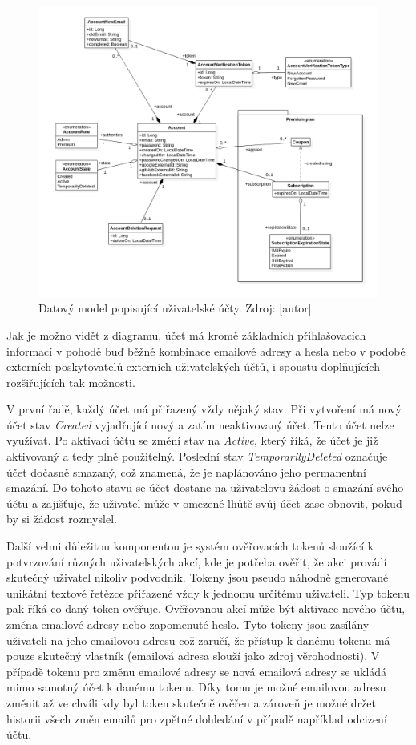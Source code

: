 		\begin{figure}[H]
			\centering
			\includegraphics[width=\linewidth]{obrazky/datovy_model_ucet}\hfill
			\caption{Datový model popisující uživatelské účty. Zdroj: [autor]}
		\end{figure}

		Jak je možno vidět z diagramu, účet má kromě základních přihlašovacích informací v pohodě buď běžné kombinace emailové adresy
		a hesla nebo v podobě externích poskytovatelů externích uživatelských účtů, i spoustu
		doplňujících rozšiřujících tak možnosti.

		V první řadě, každý účet má přiřazený vždy nějaký stav.
		Při vytvoření má nový účet stav \emph{Created} vyjadřující nový a zatím neaktivovaný účet.
		Tento účet nelze využívat.
		Po aktivaci účtu se změní stav na \emph{Active}, který říká, že účet je již aktivovaný a tedy plně použitelný.
		Poslední stav \emph{TemporarilyDeleted} označuje účet dočasně smazaný, což znamená, že je naplánováno jeho permanentní
		smazání.
		Do tohoto stavu se účet dostane na uživatelovu žádost o smazání svého účtu a zajišťuje, že uživatel může v omezené
		lhůtě svůj účet zase obnovit, pokud by si žádost rozmyslel.

		Další velmi důležitou komponentou je systém ověřovacích tokenů sloužící k potvrzování různých uživatelských akcí, kde
		je potřeba ověřit, že akci provádí skutečný uživatel nikoliv podvodník.
		Tokeny jsou pseudo náhodně generované unikátní textové řetězce přiřazené vždy k jednomu určitému uživateli.
		Typ tokenu pak říká co daný token ověřuje.
		Ověřovanou akcí může být aktivace nového účtu, změna emailové adresy nebo zapomenuté heslo.
		Tyto tokeny jsou zasílány uživateli na jeho emailovou adresu což zaručí, že přístup k danému tokenu má pouze skutečný
		vlastník (emailová adresa slouží jako zdroj věrohodnosti).
		V případě tokenu pro změnu emailové adresy se nová emailová adresy se ukládá mimo samotný účet k danému tokenu.
		Díky tomu je možné emailovou adresu změnit až ve chvíli kdy byl token skutečně ověřen a zároveň je možné držet
		historii všech změn emailů pro zpětné dohledání v případě například odcizení účtu.

